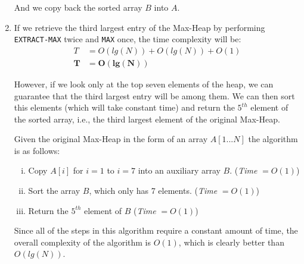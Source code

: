\documentclass{article}
\begin{document}
\begin{enumerate}[1.]
	And we copy back the sorted array $B$ into $A$.
    
    \newpage
    \item If we retrieve the third largest entry of the Max-Heap by performing \texttt{EXTRACT-MAX} twice and \texttt{MAX} once, the time complexity will be:
    \begin{align*}
        T &= O(lg(N)) + O(lg(N)) + O(1)\\
        \boldsymbol{T} &= \boldsymbol{O(lg(N))}
    \end{align*}
    
    However, if we look only at the top seven elements of the heap, we can guarantee that the third largest entry will be among them. We can then sort this elements (which will take constant time) and return the $5^{th}$ element of the sorted array, i.e., the third largest element of the original Max-Heap.
    
    Given the original Max-Heap in the form of an array $A[1...N]$ the algorithm is as follows:
        \begin{enumerate}[(i)]
            \item Copy $A[i]$ for $i = 1$ to $i = 7$ into an auxiliary array $B$. (\textit{Time} $= O(1)$)
            \item Sort the array $B$, which only has 7 elements. (\textit{Time} $= O(1)$)
            \item Return the $5^{th}$ element of $B$ (\textit{Time} $= O(1)$)
        \end{enumerate}
        
    Since all of the steps in this algorithm require a constant amount of time, the overall complexity of the algorithm is $O(1)$, which is clearly better than $O(lg(N))$.

\end{enumerate}
\end{document}
